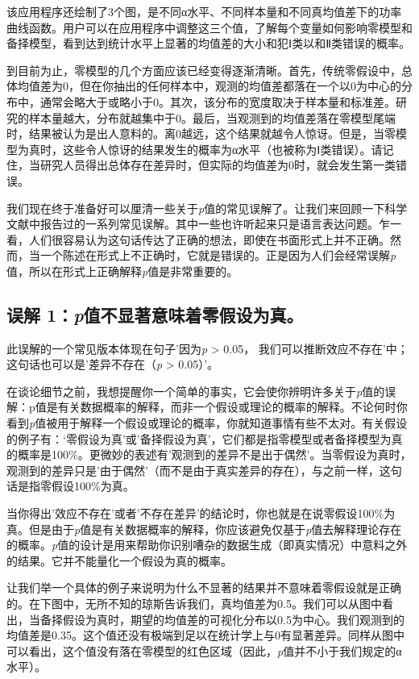 \documentclass[
  letterpaper,
  DIV=11,
  numbers=noendperiod]{scrreprt}
\begin{document}
该应用程序还绘制了3个图，是不同α水平、不同样本量和不同真均值差下的功率曲线函数。用户可以在应用程序中调整这三个值，了解每个变量如何影响零模型和备择模型，看到达到统计水平上显著的均值差的大小和犯Ⅰ类以和Ⅱ类错误的概率。

到目前为止，零模型的几个方面应该已经变得逐渐清晰。首先，传统零假设中，总体均值差为0，但在你抽出的任何样本中，观测的均值差都落在一个以0为中心的分布中，通常会略大于或略小于0。其次，该分布的宽度取决于样本量和标准差。研究的样本量越大，分布就越集中于0。最后，当观测到的均值差落在零模型尾端时，结果被认为是出人意料的。离0越远，这个结果就越令人惊讶。但是，当零模型为真时，这些令人惊讶的结果发生的概率为α水平（也被称为Ⅰ类错误）。请记住，当研究人员得出总体存在差异时，但实际的均值差为0时，就会发生第一类错误。

我们现在终于准备好可以厘清一些关于\emph{p}值的常见误解了。让我们来回顾一下科学文献中报告过的一系列常见误解。其中一些也许听起来只是语言表达问题。乍一看，人们很容易认为这句话传达了正确的想法，即使在书面形式上并不正确。然而，当一个陈述在形式上不正确时，它就是错误的。正是因为人们会经常误解\emph{p}值，所以在形式上正确解释\emph{p}值是非常重要的。

\hypertarget{sec-misconception1}{%
\subsection{\texorpdfstring{误解
1：\emph{p}值不显著意味着零假设为真。}{误解 1：p值不显著意味着零假设为真。}}\label{sec-misconception1}}

此误解的一个常见版本体现在句子'因为\emph{p} \textgreater{} 0.05，
我们可以推断效应不存在'中；这句话也可以是'差异不存在（\emph{p}
\textgreater{} 0.05）'。

在谈论细节之前，我想提醒你一个简单的事实，它会使你辨明许多关于\emph{p}值的误解：p值是有关数据概率的解释，而非一个假设或理论的概率的解释。不论何时你看到\emph{p}值被用于解释一个假设或理论的概率，你就知道事情有些不太对。有关假设的例子有：`零假设为真'或'备择假设为真'，它们都是指零模型或者备择模型为真的概率是100\%。更微妙的表述有'观测到的差异不是出于偶然'。当零假设为真时，观测到的差异只是'由于偶然'（而不是由于真实差异的存在），与之前一样，这句话是指零假设100\%为真。

当你得出'效应不存在'或者'不存在差异'的结论时，你也就是在说零假设100\%为真。但是由于\emph{p}值是有关数据概率的解释，你应该避免仅基于\emph{p}值去解释理论存在的概率。\emph{p}值的设计是用来帮助你识别嘈杂的数据生成（即真实情况）中意料之外的结果。它并不能量化一个假设为真的概率。

让我们举一个具体的例子来说明为什么不显著的结果并不意味着零假设就是正确的。在下图中，无所不知的琼斯告诉我们，真均值差为0.5。我们可以从图中看出，当备择假设为真时，期望的均值差的可视化分布以0.5为中心。我们观测到的均值差是0.35。这个值还没有极端到足以在统计学上与0有显著差异。同样从图中可以看出，这个值没有落在零模型的红色区域（因此，\emph{p}值并不小于我们规定的α水平）。
\end{document}
